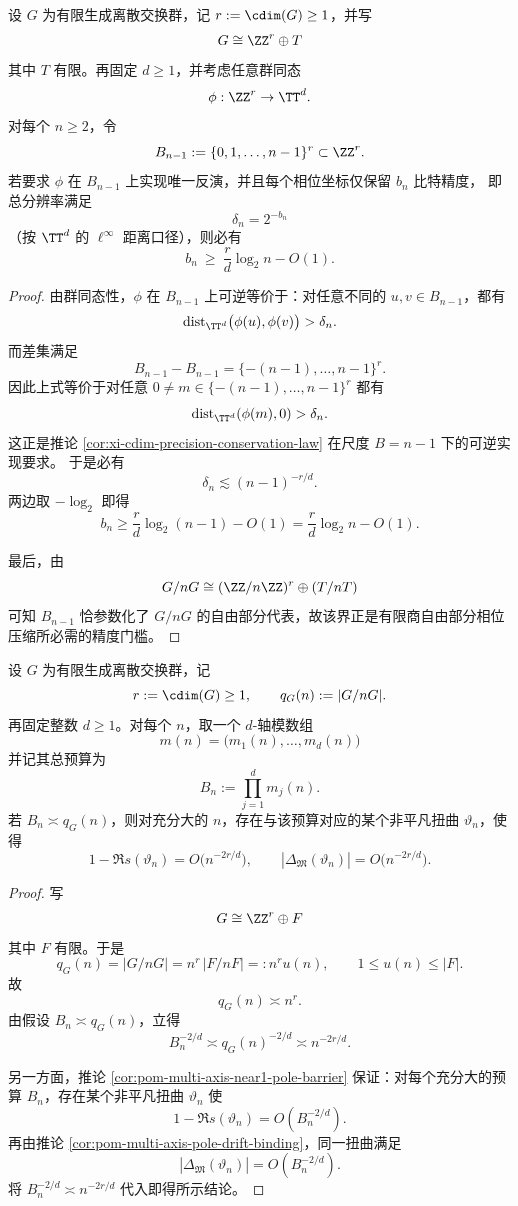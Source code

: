 \begin{theorem}[有限商的相位压缩精度下界]\label{thm:xi-finite-quotient-phase-compression-precision-lower-bound}
设 \(G\) 为有限生成离散交换群，记 \(r:=\cdim(G)\ge 1\)，并写
\[
G\cong \ZZ^r\oplus T
\]
其中 \(T\) 有限。再固定 \(d\ge 1\)，并考虑任意群同态
\[
\phi:\ZZ^r\to \TT^d.
\]
对每个 \(n\ge 2\)，令
\[
B_{n-1}:=\{0,1,\dots,n-1\}^r\subset \ZZ^r.
\]
若要求 \(\phi\) 在 \(B_{n-1}\) 上实现唯一反演，并且每个相位坐标仅保留 \(b_n\) 比特精度，
即总分辨率满足
\[
\delta_n=2^{-b_n}
\]
（按 \(\TT^d\) 的 \(\ell^\infty\) 距离口径），则必有
\[
b_n\ \ge\ \frac{r}{d}\log_2 n-O(1).
\]
\end{theorem}
\begin{proof}
由群同态性，\(\phi\) 在 \(B_{n-1}\) 上可逆等价于：对任意不同的 \(u,v\in B_{n-1}\)，都有
\[
\operatorname{dist}_{\TT^d}\bigl(\phi(u),\phi(v)\bigr)>\delta_n.
\]
而差集满足
\[
B_{n-1}-B_{n-1}=\{-(n-1),\dots,n-1\}^r.
\]
因此上式等价于对任意
\(
0\neq m\in\{-(n-1),\dots,n-1\}^r
\)
都有
\[
\operatorname{dist}_{\TT^d}(\phi(m),0)>\delta_n.
\]
这正是推论 \ref{cor:xi-cdim-precision-conservation-law} 在尺度 \(B=n-1\) 下的可逆实现要求。
于是必有
\[
\delta_n\lesssim (n-1)^{-r/d}.
\]
两边取 \(-\log_2\) 即得
\[
b_n\ge \frac{r}{d}\log_2(n-1)-O(1)
=
\frac{r}{d}\log_2 n-O(1).
\]

最后，由
\[
G/nG\cong (\ZZ/n\ZZ)^r\oplus (T/nT)
\]
可知 \(B_{n-1}\) 恰参数化了 \(G/nG\) 的自由部分代表，故该界正是有限商自由部分相位压缩所必需的精度门槛。
\end{proof}

\begin{theorem}\label{thm:xi-cdim-driven-near1-pole-approach-law}
设 \(G\) 为有限生成离散交换群，记
\[
r:=\cdim(G)\ge 1,
\qquad
q_G(n):=|G/nG|.
\]
再固定整数 \(d\ge 1\)。对每个 \(n\)，取一个 \(d\)-轴模数组
\[
m(n)=\bigl(m_1(n),\dots,m_d(n)\bigr)
\]
并记其总预算为
\[
B_n:=\prod_{j=1}^{d}m_j(n).
\]
若 \(B_n\asymp q_G(n)\)，则对充分大的 \(n\)，存在与该预算对应的某个非平凡扭曲 \(\vartheta_n\)，使得
\[
1-\Re s(\vartheta_n)=O\!\bigl(n^{-2r/d}\bigr),
\qquad
|\Delta_{\mathfrak M}(\vartheta_n)|=O\!\bigl(n^{-2r/d}\bigr).
\]
\end{theorem}
\begin{proof}
写
\[
G\cong \ZZ^r\oplus F
\]
其中 \(F\) 有限。于是
\[
q_G(n)=|G/nG|=n^r\,|F/nF|=:n^r u(n),
\qquad
1\le u(n)\le |F|.
\]
故
\[
q_G(n)\asymp n^r.
\]
由假设 \(B_n\asymp q_G(n)\)，立得
\[
B_n^{-2/d}\asymp q_G(n)^{-2/d}\asymp n^{-2r/d}.
\]

另一方面，推论 \ref{cor:pom-multi-axis-near1-pole-barrier} 保证：对每个充分大的预算 \(B_n\)，存在某个非平凡扭曲 \(\vartheta_n\) 使
\[
1-\Re s(\vartheta_n)=O(B_n^{-2/d}).
\]
再由推论 \ref{cor:pom-multi-axis-pole-drift-binding}，同一扭曲满足
\[
|\Delta_{\mathfrak M}(\vartheta_n)|=O(B_n^{-2/d}).
\]
将 \(B_n^{-2/d}\asymp n^{-2r/d}\) 代入即得所示结论。
\end{proof}

